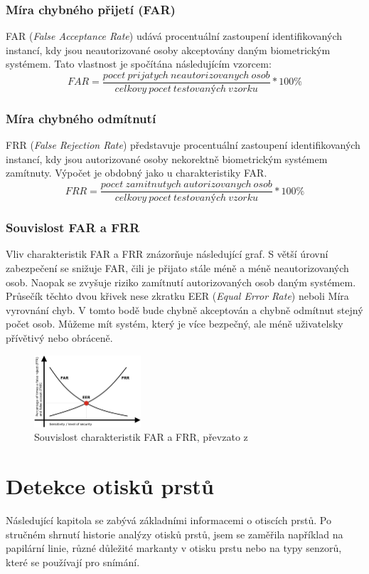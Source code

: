 \subsection{Míra chybného přijetí (FAR)}
FAR (\textit{False Acceptance Rate}) udává procentuální zastoupení identifikovaných instancí, kdy jsou neautorizované osoby akceptovány daným biometrickým systémem. Tato vlastnost je spočítána následujícím vzorcem:
$$FAR = \frac{pocet\:prijatych\:neautorizovanych\:osob}{celkovy\:pocet\:testovaných\:vzorku} * 100 \%$$

\subsection{Míra chybného odmítnutí}
FRR (\textit{False Rejection Rate}) představuje procentuální zastoupení identifikovaných instancí, kdy jsou autorizované osoby nekorektně biometrickým systémem zamítnuty. Výpočet je obdobný jako u charakteristiky FAR.
$$FRR = \frac{pocet\:zamitnutych\:autorizovanych\:osob}{celkovy\:pocet\:testovaných\:vzorku} * 100 \%$$

\subsection{Souvislost FAR a FRR}
Vliv charakteristik FAR a FRR znázorňuje následující graf. S větší úrovní zabezpečení se snižuje FAR, čili je přijato stále méně a méně neautorizovaných osob. Naopak se zvyšuje riziko zamítnutí autorizovaných osob daným systémem. Průsečík těchto dvou křivek nese zkratku EER (\textit{Equal Error Rate}) neboli Míra vyrovnání chyb. V tomto bodě bude chybně akceptován a chybně odmítnut stejný počet osob. Můžeme mít systém, který je více bezpečný, ale méně uživatelsky přívětivý nebo obráceně.\cite{FARFRR}

\begin{figure}[!htbp]
    \centering
    \includegraphics[width=150px]{obrazky-figures/frrfar.jpeg}
    \caption{Souvislost charakteristik FAR a FRR, převzato z \cite{FARFRR}}
\end{figure}

\chapter{Detekce otisků prstů}
Následující kapitola se zabývá základními informacemi o otiscích prstů. Po stručném shrnutí historie analýzy otisků prstů, jsem se zaměřila například na papilární linie, různé důležité markanty v otisku prstu nebo na typy senzorů, které se používají pro snímání.
